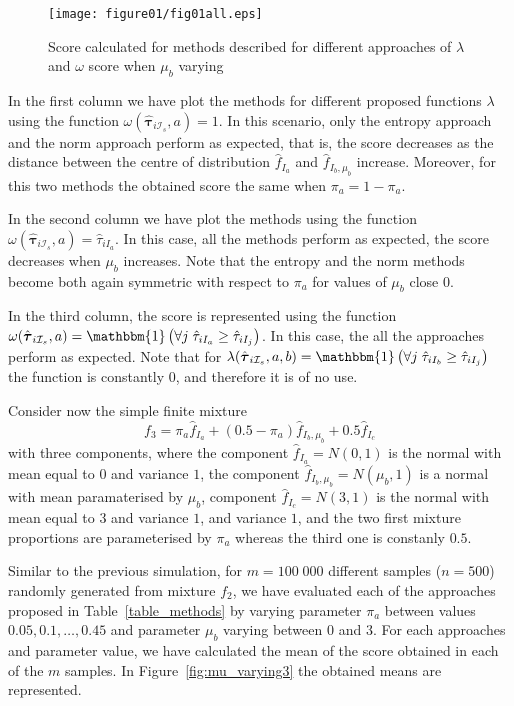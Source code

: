 \documentclass[10pt, a4paper]{article}
\newcommand{\m}[1]{\boldsymbol{#1}}
\begin{document}
\begin{figure}[!t]
\centering
\texttt{[image: figure01/fig01all.eps]}
\caption{Score calculated for methods described for different approaches of $\lambda$ and $\omega$ score when $\mu_b$ varying}
\label{fig:mu_varying}
\end{figure}

In the first column we have plot the methods for different proposed functions $\lambda$ using the function $\omega(\hat{\m \tau}_{i \mathcal{I}_s}, a) = 1$. In this scenario, only the entropy approach and the norm approach perform as expected, that is, the score decreases as the distance between the centre of distribution $\hat{f}_{I_a}$ and $\hat{f}_{I_b, \mu_b}$ increase. Moreover, for this two methods the obtained score the same when $\pi_a = 1- \pi_a$. 

In the second column we have plot the methods using the function $\omega(\hat{\m \tau}_{i \mathcal{I}_s}, a) = \hat{\tau}_{iI_a}$. In this case, all the methods perform as expected, the score decreases when $\mu_b$ increases. Note that the entropy and the norm methods become both again symmetric with respect to $\pi_a$ for values of $\mu_b$ close $0$. 

In the third column, the score is represented using the function $\omega(\hat{\m \tau}_{i \mathcal{I}_s}, a) = \mathbbm{1}\left( \forall j\; \hat{\tau}_{i I_{a}} \geq \hat{\tau}_{iI_j} \right)$. In this case, the all the approaches perform as expected. Note that for $\lambda(\hat{\m \tau}_{i \mathcal{I}_s}, a, b) = \mathbbm{1}\left( \forall j\; \hat{\tau}_{i I_{b}} \geq \hat{\tau}_{iI_j} \right)$ the function is constantly $0$, and therefore it is of no use.



Consider now the simple finite mixture
\begin{equation}\label{three_mixture}
f_3 = \pi_a \hat{f}_{I_a} + (0.5 - \pi_a) \hat{f}_{I_b, \mu_b} + 0.5 \hat{f}_{I_c}
\end{equation}
with three components, where the component $\hat{f}_{I_a} = N(0, 1)$ is the normal with mean equal to $0$ and variance $1$, the component $\hat{f}_{I_b, \mu_b} = N(\mu_b, 1)$ is a normal with mean paramaterised by $\mu_b$, component $\hat{f}_{I_c} = N(3, 1)$ is the normal with mean equal to $3$ and variance $1$,  and variance $1$, and the two first mixture proportions are parameterised by $\pi_a$ whereas the third one is constanly $0.5$. 

Similar to the previous simulation, for $m=100\;000$ different samples ($n=500$) randomly generated from mixture $f_2$, we have evaluated each of the approaches proposed in Table~\ref{table_methods} by varying parameter $\pi_a$ between values $0.05, 0.1, \dots, 0.45$ and parameter $\mu_b$ varying between $0$ and $3$. For each approaches and parameter value, we have calculated the mean of the score obtained in each of the $m$ samples. In Figure~\ref{fig:mu_varying3} the obtained means are represented.
\end{document}
